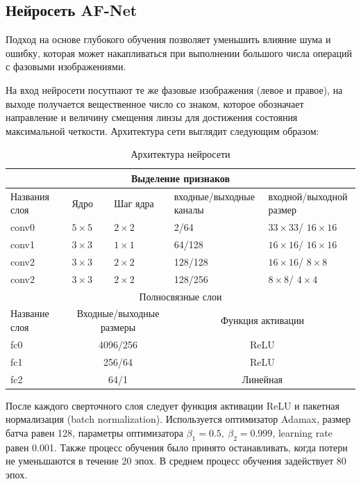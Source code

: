 \subsection{Нейросеть AF-Net}
Подход на основе глубокого обучения позволяет уменьшить влияние шума и ошибку, которая может накапливаться при выполнении большого числа операций с фазовыми изображениями.

На вход нейросети посутпают те же фазовые изображения (левое и правое), на выходе получается вещественное число со знаком, которое обозначает направление и величину смещения линзы для достижения состояния максимальной четкости. Архитектура сети выглядит следующим образом:

\begin{table}[!htbp]
	\centering
	\small
	\begin{tabular}{|p{2.5cm}<{\centering}|p{2.5cm}<{\centering}|p{2.5cm}<{\centering}|p{3.5cm}<{\centering}|p{3.5cm}<{\centering}|}
		\hline
		\multicolumn{5}{|c|}{Выделение признаков} \\ \hline
		Названия слоя & Ядро & Шаг ядра & входные/выходные каналы & входной/выходной размер\\ \hline
		conv0 & $5 \times 5$ & $2 \times 2$ & 2/64 & $33 \times 33$/ $16 \times 16$ \\ \hline
		conv1 & $3 \times 3$ & $1 \times 1$ & 64/128 & $16 \times 16$/ $16 \times 16$ \\ \hline
		conv2 & $3 \times 3$ & $2 \times 2$ & 128/128 & $16 \times 16$/ $8 \times 8$ \\ \hline
		conv2 & $3 \times 3$ & $2 \times 2$ & 128/256 & $8 \times 8$/ $4 \times 4$ \\ \hline
		\multicolumn{5}{|c|}{Полносвязные слои} \\ \hline
		Название слоя & \multicolumn{2}{c|}{Входные/выходные размеры} & \multicolumn{2}{c|}{Функция активации} \\ \hline
		fc0 & \multicolumn{2}{c|}{4096/256} & \multicolumn{2}{c|}{ReLU} \\ \hline
		fc1 & \multicolumn{2}{c|}{256/64} & \multicolumn{2}{c|}{ReLU} \\ \hline
		fc2 & \multicolumn{2}{c|}{64/1} & \multicolumn{2}{c|}{Линейная} \\ \hline
	\end{tabular}
	\caption{Архитектура нейросети}
	\label{tab:CNN_struct}
\end{table}

После каждого сверточного слоя следует функция активации ReLU и пакетная нормализация (batch normalization). Используется оптимизатор Adamax, размер батча равен 128, параметры оптимизатора $\beta_1 = 0.5,\ \beta_2 = 0.999$, learning rate равен 0.001. Также процесс обучения было принято останавливать, когда потери не уменьшаются в течение 20 эпох. В среднем процесс обучения задействует 80 эпох.

